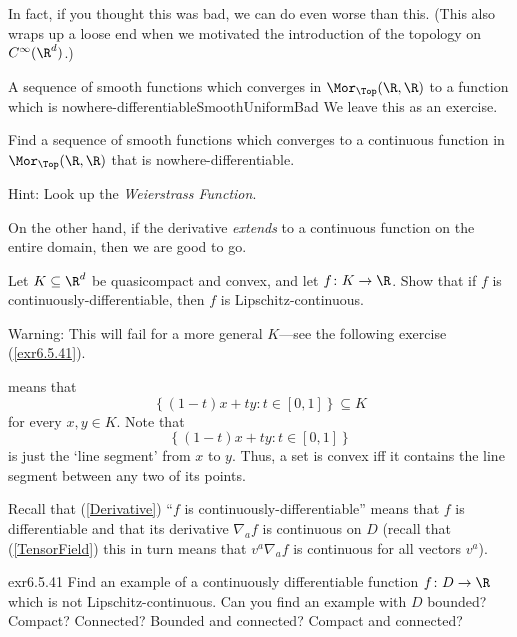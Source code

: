 In fact, if you thought this was bad, we can do even worse than this.  (This also wraps up a loose end when we motivated the introduction of the topology on $C^\infty (\R ^d)$.)
\begin{exm}{A sequence of smooth functions which converges in $\Mor _{\Top}(\R ,\R )$ to a function which is nowhere-differentiable}{SmoothUniformBad}
	We leave this as an exercise.
	\begin{exr}[breakable=false]{}{}
		Find a sequence of smooth functions which converges to a continuous function in $\Mor _{\Top}(\R ,\R )$ that is nowhere-differentiable.
		\begin{rmk}
			Hint:  Look up the \emph{Weierstrass Function}.
		\end{rmk}
	\end{exr}
\end{exm}
On the other hand, if the derivative \emph{extends} to a continuous function on the entire domain, then we are good to go.
\begin{exr}{}{}
Let $K\subseteq \R ^d$ be quasicompact and convex, and let $f\colon K\rightarrow \R$.  Show that if $f$ is continuously-differentiable, then $f$ is Lipschitz-continuous.
\begin{wrn}
Warning:  This will fail for a more general $K$---see the following exercise (\cref{exr6.5.41}).
\end{wrn}
\begin{rmk}
 means that
\begin{equation}
\left\{ (1-t)x+ty:t\in [0,1]\right\} \subseteq K
\end{equation}
for every $x,y\in K$.  Note that
\begin{equation}
\left\{ (1-t)x+ty:t\in [0,1]\right\}
\end{equation}
is just the `line segment' from $x$ to $y$.  Thus, a set is convex iff it contains the line segment between any two of its points.
\end{rmk}
\begin{rmk}
Recall that (\cref{Derivative}) ``$f$ is continuously-differentiable'' means that $f$ is differentiable and that its derivative $\nabla _af$ is continuous on $D$ (recall that (\cref{TensorField}) this in turn means that $v^a\nabla _af$ is continuous for all vectors $v^a$).
\end{rmk}
\end{exr}
\begin{exr}{}{exr6.5.41}
Find an example of a continuously differentiable function $f\colon D\rightarrow \R$ which is not Lipschitz-continuous.  Can you find an example with $D$ bounded?  Compact?  Connected?  Bounded and connected?  Compact and connected?
\end{exr}

